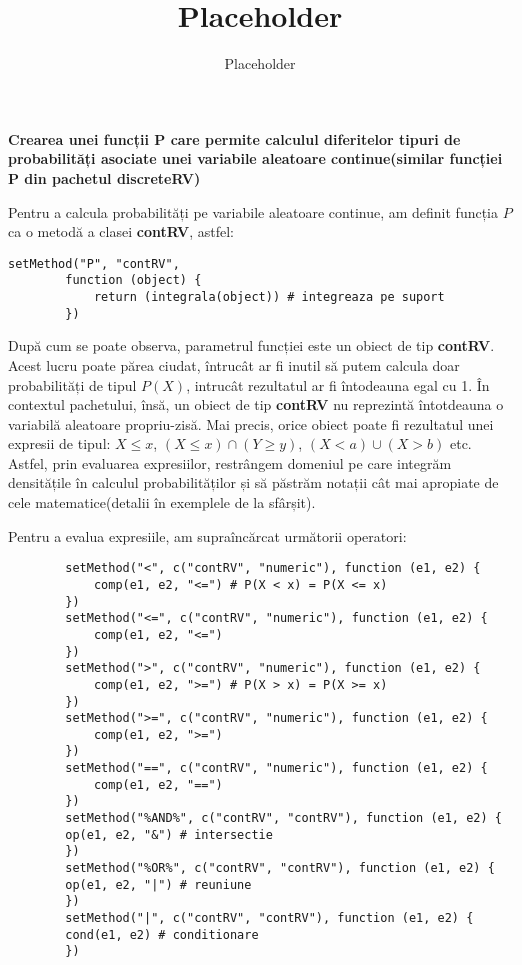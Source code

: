 \documentclass[12pt]{article}
\title{Placeholder}
\author{Placeholder}
\begin{document}
	\textbf{Crearea unei funcții P care permite calculul diferitelor tipuri de probabilități asociate
		unei variabile aleatoare continue(similar funcției P din pachetul discreteRV) }\vspace{5mm}
	
	Pentru a calcula probabilități pe variabile aleatoare continue, am definit funcția $P$ ca o metodă a clasei \textbf{contRV}, astfel:
	\begin{lstlisting}[numbers=none]
		setMethod("P", "contRV",
		function (object) {
			return (integrala(object)) # integreaza pe suport
		})
	\end{lstlisting}

	După cum se poate observa, parametrul funcției este un obiect de tip \textbf{contRV}. Acest lucru poate părea ciudat, întrucât ar fi inutil să putem calcula doar probabilități de tipul $P(X)$, intrucât rezultatul ar fi întodeauna egal cu 1. În contextul pachetului, însă, un obiect de tip \textbf{contRV} nu reprezintă întotdeauna o variabilă aleatoare propriu-zisă. Mai precis, orice obiect poate fi rezultatul unei expresii de tipul: $X \leq x$, $(X \leq x) \cap  (Y \geq y)$, $(X < a) \cup (X > b)$ etc. Astfel, prin evaluarea expresiilor, restrângem domeniul pe care integrăm densitățile în calculul probabilităților și să păstrăm notații cât mai apropiate de cele matematice(detalii în exemplele de la sfârșit).\par
	
	Pentru a evalua expresiile, am supraîncărcat următorii operatori:
	\begin{lstlisting}
		setMethod("<", c("contRV", "numeric"), function (e1, e2) {
			comp(e1, e2, "<=") # P(X < x) = P(X <= x)
		})
		setMethod("<=", c("contRV", "numeric"), function (e1, e2) {
			comp(e1, e2, "<=")
		})
		setMethod(">", c("contRV", "numeric"), function (e1, e2) {
			comp(e1, e2, ">=") # P(X > x) = P(X >= x)
		})
		setMethod(">=", c("contRV", "numeric"), function (e1, e2) {
			comp(e1, e2, ">=")
		})
		setMethod("==", c("contRV", "numeric"), function (e1, e2) {
			comp(e1, e2, "==")
		})
		setMethod("%AND%", c("contRV", "contRV"), function (e1, e2) {
		op(e1, e2, "&") # intersectie
		})
		setMethod("%OR%", c("contRV", "contRV"), function (e1, e2) {
		op(e1, e2, "|") # reuniune
		})
		setMethod("|", c("contRV", "contRV"), function (e1, e2) {
		cond(e1, e2) # conditionare
		})
	\end{lstlisting}\pagebreak
\end{document}
